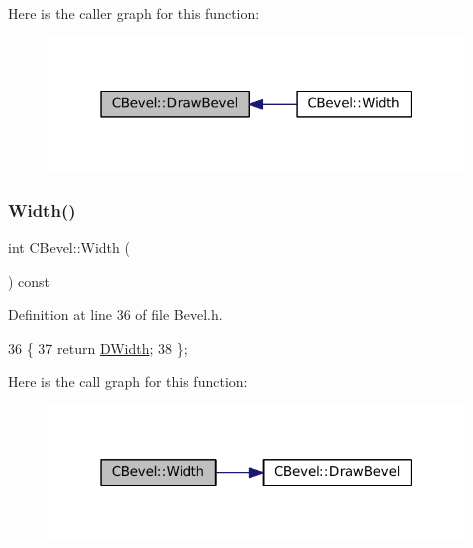 Here is the caller graph for this function\+:
\nopagebreak
\begin{figure}[H]
\begin{center}
\leavevmode
\includegraphics[width=313pt]{classCBevel_a407870821f37aa77621723116e979c4c_icgraph}
\end{center}
\end{figure}
\hypertarget{classCBevel_a40e07306be05c5683ceb9db1aa200f6a}{}\label{classCBevel_a40e07306be05c5683ceb9db1aa200f6a} 
\subsubsection{\texorpdfstring{Width()}{Width()}}
{\footnotesize\ttfamily int C\+Bevel\+::\+Width (\begin{DoxyParamCaption}{ }\end{DoxyParamCaption}) const\hspace{0.3cm}{\ttfamily [inline]}}



Definition at line 36 of file Bevel.\+h.


\begin{DoxyCode}
36                          \{
37             \textcolor{keywordflow}{return} \hyperlink{classCBevel_a891dccc1828c48e5e7a475ca33080060}{DWidth};
38         \};
\end{DoxyCode}
Here is the call graph for this function\+:
\nopagebreak
\begin{figure}[H]
\begin{center}
\leavevmode
\includegraphics[width=313pt]{classCBevel_a40e07306be05c5683ceb9db1aa200f6a_cgraph}
\end{center}
\end{figure}


